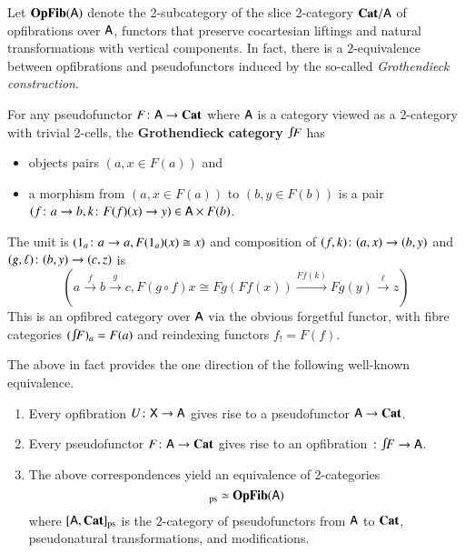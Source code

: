 \documentclass[reqno]{amsart}
\begin{document}
Let $\mathbf{OpFib}(\mathsf{A})$ denote the 2-subcategory of the slice 2-category $\mathbf{Cat}/ \mathsf{A}$ of opfibrations over $\mathsf{A}$, functors that preserve cocartesian liftings and natural transformations with vertical components. In fact, there is a 2-equivalence between opfibrations and pseudofunctors induced by the so-called \emph{Grothendieck construction}. 
\begin{defn}\label{def:GrothCat}
For any pseudofunctor $F\colon\mathsf{A}\to\mathbf{Cat}$ where $\mathsf{A}$ is a category viewed as a 2-category with trivial 2-cells, the \textbf{Grothendieck category}
$\inta F$ has
\begin{itemize}
\item objects pairs $(a, x \in F(a))$ and
\item a morphism from $(a, x \in F(a))$ to $(b, y\in F(b))$ is a pair $(f \colon a \to b,k \colon F(f)(x) \to y)\in\mathsf{A}\times F(b)$.
\end{itemize}
The unit is $(1_a\colon a\to a,F(1_a)(x)\cong x)$ and composition of $(f,k)\colon(a,x)\to(b,y)$ and $(g,\ell)\colon(b,y)\to(c,z)$ is
\begin{equation}\label{eq:compGrothcat}
\left(a\xrightarrow{f}b\xrightarrow{g}c, F(g\circ f)x\cong Fg(Ff(x))\xrightarrow{Ff(k)}Fg(y)\xrightarrow{\ell}z\right) 
\end{equation}
This is an opfibred category over $\mathsf{A}$ via the obvious forgetful functor, with fibre categories $(\inta F)_a=F(a)$ and reindexing functors $f_!=F(f)$.
\end{defn}
The above in fact provides the one direction of the following well-known equivalence.

\begin{thm}\label{thm:Grothendieck}\hfill
    \begin{enumerate}
        \item Every opfibration $U \colon \mathsf{X} \to \mathsf{A}$ gives rise to a pseudofunctor $\mathsf{A} \to \mathbf{Cat}$.
        \item Every pseudofunctor $F \colon \mathsf{A} \to \mathbf{Cat}$ gives rise to  an opfibration $\maps \inta F\to\A$.
        \item The above correspondences yield an equivalence of 2-categories 
        \begin{displaymath}
            [\A,\Cat]_\pse \simeq \OpFib(\A)
        \end{displaymath}
           where $[\mathsf{A},\mathbf{Cat}]_{\mathrm{ps}}$ is the 2-category 
of pseudofunctors from $\mathsf{A}$ to $\mathbf{Cat}$, pseudonatural transformations, and modifications.
    \end{enumerate}
\end{thm}
\end{document}
